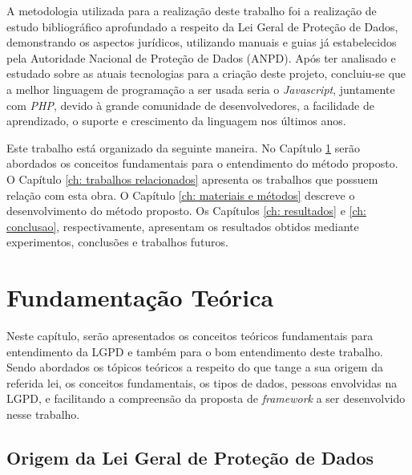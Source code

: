 \documentclass[
	12pt,				%
	openright,			%
	oneside,			%
	a4paper,			%
	english,			%
	french,				%
	spanish,			%
	brazil,				%
	]{abntex2}
\begin{document}
A metodologia utilizada para a realização deste trabalho foi a realização de estudo bibliográfico aprofundado a respeito da Lei Geral de Proteção de Dados, demonstrando os aspectos jurídicos, utilizando manuais e guias já estabelecidos pela Autoridade Nacional de Proteção de Dados (ANPD). Após ter analisado e estudado sobre as atuais tecnologias para a criação deste projeto, concluiu-se que a melhor linguagem de programação a ser usada seria o \textit{Javascript}, juntamente com \textit{PHP}, devido à grande comunidade de desenvolvedores, a facilidade de aprendizado, o suporte e crescimento da linguagem nos últimos anos.


Este trabalho está organizado da seguinte maneira. No Capítulo \ref{ch: fundamentacao teorica} serão abordados os conceitos fundamentais para o entendimento do método proposto. O Capítulo \ref{ch: trabalhos relacionados} apresenta os trabalhos que possuem relação com esta obra. O Capítulo \ref{ch: materiais e métodos} descreve o desenvolvimento do método proposto. Os Capítulos \ref{ch: resultados} e \ref{ch: conclusao}, respectivamente, apresentam os resultados obtidos mediante experimentos, conclusões e trabalhos futuros.


\setcounter{chapter}{1}
\chapter{Fundamentação Teórica}
\label{ch: fundamentacao teorica}


Neste capítulo, serão apresentados os conceitos teóricos fundamentais para entendimento da LGPD e também para o bom entendimento deste trabalho. Sendo abordados os tópicos teóricos a respeito do que tange a sua origem da referida lei, os conceitos fundamentais, os tipos de dados, pessoas envolvidas na LGPD, e facilitando a compreensão da proposta de \textit{framework} a ser desenvolvido nesse trabalho.

\section{Origem da Lei Geral de Proteção de Dados }
\label{sec: exemplo}
\end{document}
